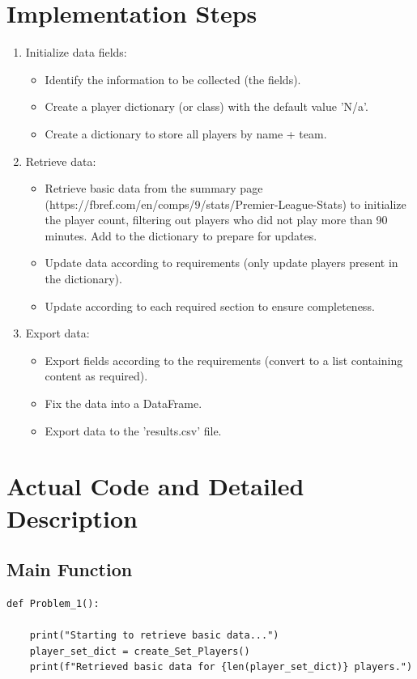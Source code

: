 \documentclass[12pt]{report}
\begin{document}
{\section{Implementation Steps} %
	\begin{enumerate}
		\item Initialize data fields:
		\begin{itemize}
			\item Identify the information to be collected (the fields).
\item Create a player dictionary (or class) with the default value 'N/a'.
\item Create a dictionary to store all players by name + team.
\end{itemize}
		\item Retrieve data:
		\begin{itemize}
			\item Retrieve basic data from the summary page (https://fbref.com/en/comps/9/stats/Premier-League-Stats) to initialize the player count, filtering out players who did not play more than 90 minutes.
Add to the dictionary to prepare for updates.
			\item Update data according to requirements (only update players present in the dictionary).
\item Update according to each required section to ensure completeness.
\end{itemize}
		\item Export data:
		\begin{itemize}
			\item Export fields according to the requirements (convert to a list containing content as required).
\item Fix the data into a DataFrame.
			\item Export data to the 'results.csv' file.
		\end{itemize}
	\end{enumerate}

\section{Actual Code and Detailed Description} %
\subsection{Main Function} %
\begin{lstlisting}
def Problem_1():

	print("Starting to retrieve basic data...")
	player_set_dict = create_Set_Players()
	print(f"Retrieved basic data for {len(player_set_dict)} players.")


\end{lstlisting}}
\end{document}
